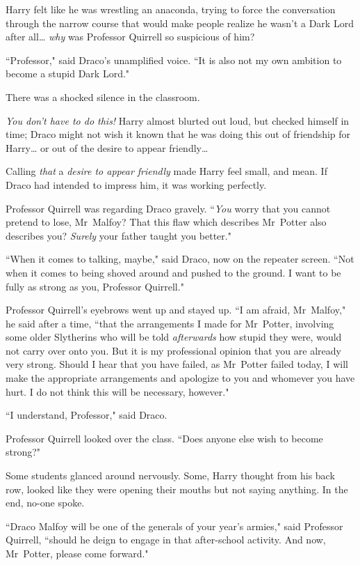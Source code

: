Harry felt like he was wrestling an anaconda, trying to force the conversation through the narrow course that would make people realize he wasn't a Dark Lord after all{\ldots} \emph{why} was Professor Quirrell so suspicious of him?

``Professor," said Draco's unamplified voice. ``It is also not my own ambition to become a stupid Dark Lord."

There was a shocked silence in the classroom.

\emph{You don't have to do this!} Harry almost blurted out loud, but checked himself in time; Draco might not wish it known that he was doing this out of friendship for Harry{\ldots} or out of the desire to appear friendly{\ldots}

Calling \emph{that} a \emph{desire to appear friendly} made Harry feel small, and mean. If Draco had intended to impress him, it was working perfectly.

Professor Quirrell was regarding Draco gravely. ``\emph{You} worry that you cannot pretend to lose, Mr~Malfoy? That this flaw which describes Mr~Potter also describes you? \emph{Surely} your father taught you better."

``When it comes to talking, maybe," said Draco, now on the repeater screen. ``Not when it comes to being shoved around and pushed to the ground. I want to be fully as strong as you, Professor Quirrell."

Professor Quirrell's eyebrows went up and stayed up. ``I am afraid, Mr~Malfoy," he said after a time, ``that the arrangements I made for Mr~Potter, involving some older Slytherins who will be told \emph{afterwards} how stupid they were, would not carry over onto you. But it is my professional opinion that you are already very strong. Should I hear that you have failed, as Mr~Potter failed today, I will make the appropriate arrangements and apologize to you and whomever you have hurt. I do not think this will be necessary, however."

``I understand, Professor," said Draco.

Professor Quirrell looked over the class. ``Does anyone else wish to become strong?"

Some students glanced around nervously. Some, Harry thought from his back row, looked like they were opening their mouths but not saying anything. In the end, no-one spoke.

``Draco Malfoy will be one of the generals of your year's armies," said Professor Quirrell, ``should he deign to engage in that after-school activity. And now, Mr~Potter, please come forward."

